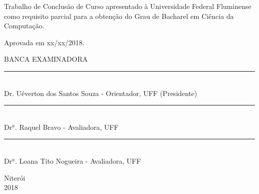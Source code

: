 \noindent
\begin{flushright}
\begin{minipage}[t]{8cm}

Trabalho de Conclusão de Curso apresentado à Universidade Federal Fluminense como requisito parcial para a obtenção do Grau
de Bacharel em Ciência da Computação.

\end{minipage}
\end{flushright}
\vspace{1.0 cm}
\noindent
Aprovada em xx/xx/2018. \\ 
\begin{flushright}
\end{flushright}
\parbox{11cm}
{
 \begin{center}
BANCA EXAMINADORA \\
  \vspace{4mm}
  \rule{11cm}{.1mm} \\
    Dr. Uéverton dos Santos Souza - Orientador, UFF (Presidente)\\
    \vspace{4mm}
  \rule{11cm}{.1mm} \\
    Dr$^{\underline{a}}$. Raquel Bravo - Avaliadora, UFF\\
    \vspace{4mm}
  \rule{11cm}{.1mm} \\
    Dr$^{\underline{a}}$. Loana Tito Nogueira - Avaliadora, UFF\\
    \vspace{4mm}
  \end{center}
  }
\begin{center}
  \vspace{6mm}
  Niterói \\
  \vspace{6mm}
  2018
\end{center}






